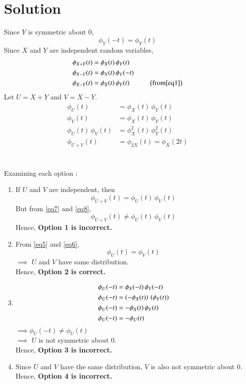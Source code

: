 \documentclass[journal,12pt,twocolumn]{IEEEtran}
\begin{document}
\section*{Solution}
Since $Y$ is symmetric about $0$, 
\begin{equation}
    \phi_Y(-t) = \phi_Y(t) \label{eq1}
\end{equation}
Since $X$ and $Y$ are independent random variables,
\begin{align}
    \phi_{X+Y}(t) &= \phi_X(t)\, \phi_Y(t) \label{eq2}\\
    \phi_{X-Y}(t) &= \phi_X(t)\, \phi_Y(-t) \label{eq3}\\
    \phi_{X-Y}(t) &= \phi_X(t)\, \phi_Y(t) \hspace{1cm}\left(\text{from} \eqref{eq1}\right) \label{eq4}
\end{align}
Let $U=X+Y$ and $V=X-Y$.
\begin{align}
    \phi_U(t) &= \phi_X(t)\, \phi_Y(t) \label{eq5}\\
    \phi_V(t) &= \phi_X(t)\, \phi_Y(t) \label{eq6}\\
    \phi_U(t) \, \phi_V(t) &= \phi_X^2(t) \, \phi_Y^2(t) \label{eq7}\\
    \phi_{U+V}(t) &= \phi_{2X}(t) = \phi_{X}(2t) \label{eq8}
\end{align}
\\\\
Examining each option : 
\begin{enumerate}
    \item 
    If $U$ and $V$ are independent, then \[\phi_{U+V}(t) = \phi_U(t)\, \phi_V(t)\]
    But from \eqref{eq7} and \eqref{eq8}, 
    \begin{equation}
        \phi_{U+V}(t) \neq \phi_U(t)\, \phi_V(t)
    \end{equation}
    Hence, \textbf{Option 1 is incorrect.}\\
    
    \item 
    From \eqref{eq5} and \eqref{eq6}, \[\phi_U(t) = \phi_V(t)\]
    $\implies$ $U$ and $V$ have same distribution.\\
    Hence, \textbf{Option 2 is correct.}\\
    
    \item 
    \begin{align}
        \phi_U(-t) &= \phi_X(-t)\, \phi_Y(-t) \\
        \phi_U(-t) &= \left(-\phi_X(t)\right)\, \left(\phi_Y(t)\right) \\
        \phi_U(-t) &= -\phi_X(t)\, \phi_Y(t) \\
        \phi_U(-t) &= -\phi_U(t)
    \end{align}
    \(\implies \phi_U(-t) \neq \phi_U(t)\) \\
    $\implies$ $U$ is not symmetric about $0$.\\
    Hence, \textbf{Option 3 is incorrect.}\\
    
    \item 
    Since $U$ and $V$ have the same distribution, $V$ is also not symmetric about $0$.\\
    Hence, \textbf{Option 4 is incorrect.}
\end{enumerate}
\end{document}
